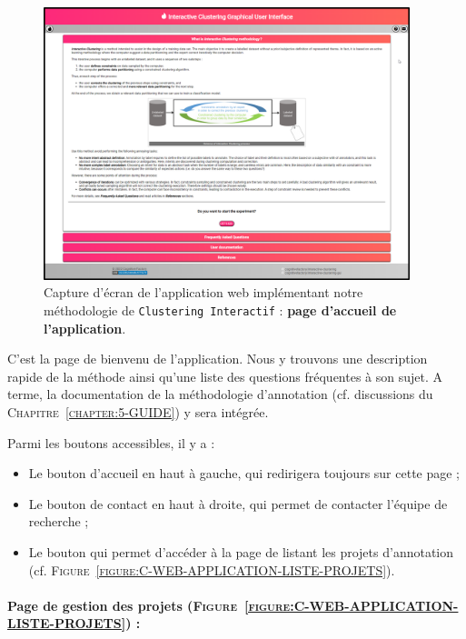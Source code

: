 		\begin{figure}[H]
			\centering
			\includegraphics[width=0.95\textwidth]{figures/interactive-clustering-application-accueil-application}
			\caption{
				Capture d'écran de l'application web implémentant notre méthodologie de \texttt{Clustering Interactif} : \textbf{page d'accueil de l'application}.
			}
			\label{figure:C-WEB-APPLICATION-ACCUEIL}
		\end{figure}
		
		C'est la page de bienvenu de l'application.
		Nous y trouvons une description rapide de la méthode ainsi qu'une liste des questions fréquentes à son sujet.
		A terme, la documentation de la méthodologie d'annotation (cf. discussions du \textsc{Chapitre~\ref{chapter:5-GUIDE}}) y sera intégrée.
		
		Parmi les boutons accessibles, il y a :
		\begin{itemize}
			\item Le bouton d'accueil en haut à gauche, qui redirigera toujours sur cette page ;
			\item Le bouton de contact en haut à droite, qui permet de contacter l'équipe de recherche ;
			\item Le bouton  qui permet d'accéder à la page de listant les projets d'annotation (cf. \textsc{Figure~\ref{figure:C-WEB-APPLICATION-LISTE-PROJETS}}).
		\end{itemize}
	
	
	\newpage
	\paragraph{Page de gestion des projets (\textsc{Figure~\ref{figure:C-WEB-APPLICATION-LISTE-PROJETS}}) :}
		
